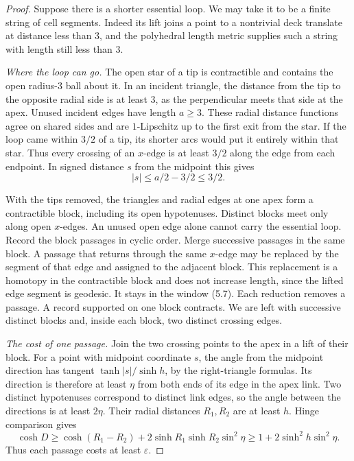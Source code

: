 \documentclass[11pt,a4paper]{article}
\numberwithin{equation}{section}
\begin{document}
\begin{proof}
Suppose there is a shorter essential loop. We may take it to be a finite string of cell segments. Indeed its lift joins a point to a nontrivial deck translate at distance less than \(3\), and the polyhedral length metric supplies such a string with length still less than \(3\).

\emph{Where the loop can go.} The open star of a tip is contractible and contains the open radius-\(3\) ball about it. In an incident triangle, the distance from the tip to the opposite radial side is at least \(3\), as the perpendicular meets that side at the apex. Unused incident edges have length \(a\ge3\). These radial distance functions agree on shared sides and are \(1\)-Lipschitz up to the first exit from the star. If the loop came within \(3/2\) of a tip, its shorter arcs would put it entirely within that star. Thus every crossing of an \(x\)-edge is at least \(3/2\) along the edge from each endpoint. In signed distance \(s\) from the midpoint this gives
\begin{equation}
 |s|\le a/2-3/2\le3/2.
\end{equation}

With the tips removed, the triangles and radial edges at one apex form a contractible block, including its open hypotenuses. Distinct blocks meet only along open \(x\)-edges. An unused open edge alone cannot carry the essential loop. Record the block passages in cyclic order. Merge successive passages in the same block. A passage that returns through the same \(x\)-edge may be replaced by the segment of that edge and assigned to the adjacent block. This replacement is a homotopy in the contractible block and does not increase length, since the lifted edge segment is geodesic. It stays in the window (5.7). Each reduction removes a passage. A record supported on one block contracts. We are left with successive distinct blocks and, inside each block, two distinct crossing edges.

\emph{The cost of one passage.} Join the two crossing points to the apex in a lift of their block. For a point with midpoint coordinate \(s\), the angle from the midpoint direction has tangent \(\tanh|s|/\sinh h\), by the right-triangle formulas. Its direction is therefore at least \(\eta\) from both ends of its edge in the apex link. Two distinct hypotenuses correspond to distinct link edges, so the angle between the directions is at least \(2\eta\). Their radial distances \(R_1,R_2\) are at least \(h\). Hinge comparison gives
\[
 \cosh D\ge\cosh(R_1-R_2)+2\sinh R_1\sinh R_2\sin^2\eta
 \ge1+2\sinh^2h\sin^2\eta.
\]
Thus each passage costs at least \(\varepsilon\).


\end{proof}
\end{document}
